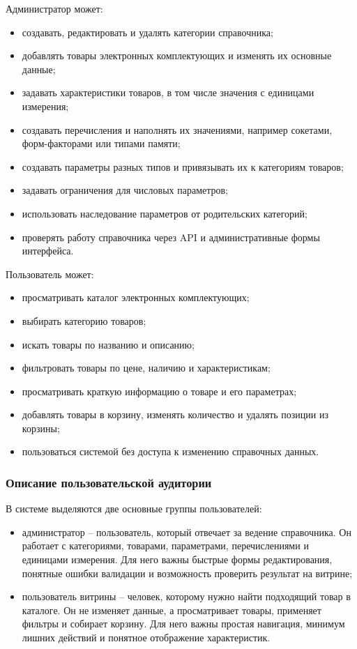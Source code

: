 \documentclass[a4paper,14pt]{extarticle}
\begin{document}
Администратор может:
\begin{itemize}
    \item создавать, редактировать и удалять категории справочника;
    \item добавлять товары электронных комплектующих и изменять их основные данные;
    \item задавать характеристики товаров, в том числе значения с единицами измерения;
    \item создавать перечисления и наполнять их значениями, например сокетами, форм-факторами или типами памяти;
    \item создавать параметры разных типов и привязывать их к категориям товаров;
    \item задавать ограничения для числовых параметров;
    \item использовать наследование параметров от родительских категорий;
    \item проверять работу справочника через API и административные формы интерфейса.
\end{itemize}

Пользователь может:
\begin{itemize}
    \item просматривать каталог электронных комплектующих;
    \item выбирать категорию товаров;
    \item искать товары по названию и описанию;
    \item фильтровать товары по цене, наличию и характеристикам;
    \item просматривать краткую информацию о товаре и его параметрах;
    \item добавлять товары в корзину, изменять количество и удалять позиции из корзины;
    \item пользоваться системой без доступа к изменению справочных данных.
\end{itemize}

\subsubsection{Описание пользовательской аудитории}

В системе выделяются две основные группы пользователей:
\begin{itemize}
    \item администратор -- пользователь, который отвечает за ведение справочника. Он работает с категориями, товарами, параметрами, перечислениями и единицами измерения. Для него важны быстрые формы редактирования, понятные ошибки валидации и возможность проверить результат на витрине;
    \item пользователь витрины -- человек, которому нужно найти подходящий товар в каталоге. Он не изменяет данные, а просматривает товары, применяет фильтры и собирает корзину. Для него важны простая навигация, минимум лишних действий и понятное отображение характеристик.
\end{itemize}
\end{document}
